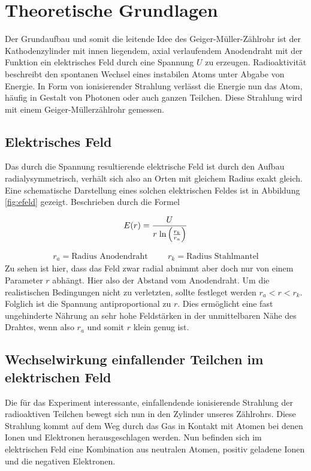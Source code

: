 
\section{Theoretische Grundlagen}
Der Grundaufbau und somit die leitende Idee des Geiger-Müller-Zählrohr ist der Kathodenzylinder %
mit innen liegendem, axial verlaufendem Anodendraht mit der Funktion ein elektrisches Feld durch eine Spannung $U$ zu erzeugen.
Radioaktivität beschreibt den spontanen Wechsel eines instabilen Atoms unter Abgabe von Energie. In Form von ionisierender Strahlung verlässt die Energie nun das Atom, häufig in Gestalt von Photonen oder auch ganzen Teilchen.
Diese Strahlung wird mit einem Geiger-Müllerzählrohr gemessen.

\subsection{Elektrisches Feld}
Das durch die Spannung resultierende elektrische Feld ist durch den Aufbau radialysymmetrisch, verhält sich also an Orten mit gleichem Radius exakt gleich.
Eine schematische Darstellung eines solchen elektrischen Feldes ist in Abbildung \ref{fig:efeld} gezeigt.
Beschrieben durch die Formel 

\begin{equation}  %
\label{eqn:efeld}
E(r) = \frac{U}{r \hspace{0.1cm} \text{ln} \left( \frac{r_k}{r_a} \right) }
\end{equation}

\begin{align*}
r_a = \text{Radius Anodendraht}     \hspace{1cm} r_k = \text{Radius Stahlmantel}
\end{align*}
Zu sehen ist hier, dass das Feld zwar radial abnimmt aber doch nur von einem Parameter $r$ abhängt. Hier also der Abstand vom Anodendraht.
Um die realistischen Bedingungen nicht zu verletzten, sollte festleget werden $r_a<r<r_k$.
Folglich ist die Spannung antiproportional zu $r$. Dies ermöglicht eine fast ungehinderte Nährung an sehr hohe Feldstärken in der unmittelbaren Nähe des Drahtes, wenn also $r_a$ und somit $r$ klein genug ist. 

\subsection{Wechselwirkung einfallender Teilchen im elektrischen Feld} %
Die für das Experiment interessante, einfallendende ionisierende Strahlung der radioaktiven Teilchen bewegt sich nun in den Zylinder unseres Zählrohrs.
Diese Strahlung kommt auf dem Weg durch das Gas in Kontakt mit Atomen bei denen Ionen und Elektronen herausgeschlagen werden. 
Nun befinden sich im elektrischen Feld eine Kombination aus neutralen Atomen, positiv geladene Ionen und die negativen Elektronen. 

